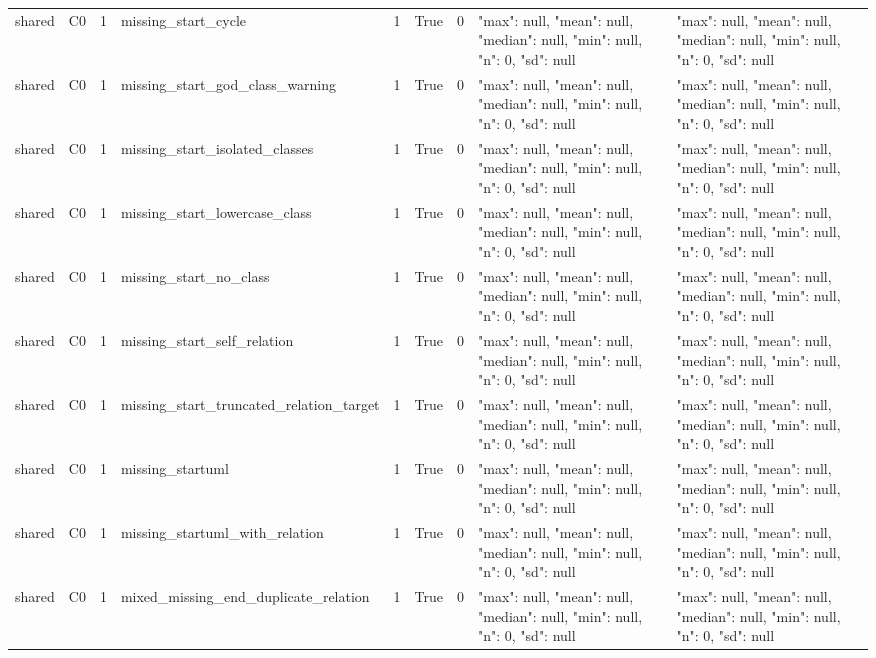 \begin{tabular}{lllllllll}
shared & C0 & 1 & missing\_start\_cycle & 1 & True & 0 & {"max": null, "mean": null, "median": null, "min": null, "n": 0, "sd": null} & {"max": null, "mean": null, "median": null, "min": null, "n": 0, "sd": null} \\
shared & C0 & 1 & missing\_start\_god\_class\_warning & 1 & True & 0 & {"max": null, "mean": null, "median": null, "min": null, "n": 0, "sd": null} & {"max": null, "mean": null, "median": null, "min": null, "n": 0, "sd": null} \\
shared & C0 & 1 & missing\_start\_isolated\_classes & 1 & True & 0 & {"max": null, "mean": null, "median": null, "min": null, "n": 0, "sd": null} & {"max": null, "mean": null, "median": null, "min": null, "n": 0, "sd": null} \\
shared & C0 & 1 & missing\_start\_lowercase\_class & 1 & True & 0 & {"max": null, "mean": null, "median": null, "min": null, "n": 0, "sd": null} & {"max": null, "mean": null, "median": null, "min": null, "n": 0, "sd": null} \\
shared & C0 & 1 & missing\_start\_no\_class & 1 & True & 0 & {"max": null, "mean": null, "median": null, "min": null, "n": 0, "sd": null} & {"max": null, "mean": null, "median": null, "min": null, "n": 0, "sd": null} \\
shared & C0 & 1 & missing\_start\_self\_relation & 1 & True & 0 & {"max": null, "mean": null, "median": null, "min": null, "n": 0, "sd": null} & {"max": null, "mean": null, "median": null, "min": null, "n": 0, "sd": null} \\
shared & C0 & 1 & missing\_start\_truncated\_relation\_target & 1 & True & 0 & {"max": null, "mean": null, "median": null, "min": null, "n": 0, "sd": null} & {"max": null, "mean": null, "median": null, "min": null, "n": 0, "sd": null} \\
shared & C0 & 1 & missing\_startuml & 1 & True & 0 & {"max": null, "mean": null, "median": null, "min": null, "n": 0, "sd": null} & {"max": null, "mean": null, "median": null, "min": null, "n": 0, "sd": null} \\
shared & C0 & 1 & missing\_startuml\_with\_relation & 1 & True & 0 & {"max": null, "mean": null, "median": null, "min": null, "n": 0, "sd": null} & {"max": null, "mean": null, "median": null, "min": null, "n": 0, "sd": null} \\
shared & C0 & 1 & mixed\_missing\_end\_duplicate\_relation & 1 & True & 0 & {"max": null, "mean": null, "median": null, "min": null, "n": 0, "sd": null} & {"max": null, "mean": null, "median": null, "min": null, "n": 0, "sd": null} \\

\end{tabular}
